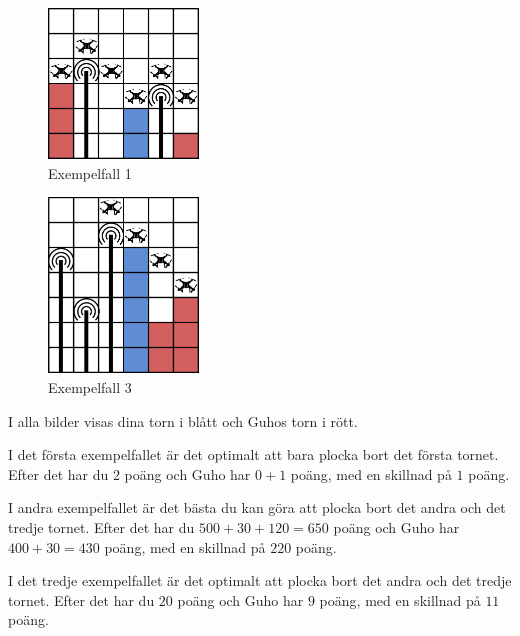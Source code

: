 \begin{figure}[!h]
  \centering
  \includegraphics[width=4cm]{sample1.png}
  \caption{Exempelfall 1}
\end{figure}
\begin{figure}[!h]
  \centering
  \includegraphics[width=4cm]{sample3.png}
  \caption{Exempelfall 3}
\end{figure}
I alla bilder visas dina torn i blått och Guhos torn i rött.

I det första exempelfallet är det optimalt att bara plocka bort det första tornet. Efter det har du $2$ poäng och Guho har $0+1$ poäng, med en skillnad på $1$ poäng.

I andra exempelfallet är det bästa du kan göra att plocka bort det andra och det tredje tornet. Efter det har du $500+30+120=650$ poäng och Guho har $400+30=430$ poäng, med en skillnad på $220$ poäng.

I det tredje exempelfallet är det optimalt att plocka bort det andra och det tredje tornet. Efter det har du $20$ poäng och Guho har $9$ poäng, med en skillnad på $11$ poäng.
